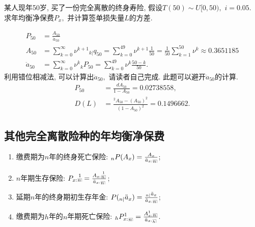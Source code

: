 \documentclass[lang=cn,10pt]{elegantbook}
\makeatletter
\DeclareRobustCommand{\annu}[1]{_{%
    \def\arraystretch{0}%
    \setlength\arraycolsep{1pt}%
    \setlength\arrayrulewidth{.2pt}%
    \begin{array}[b]{@{}c|}\hline
        \\[\arraycolsep]%
        \scriptstyle #1%
    \end{array}%
}}
\makeatother
\begin{document}
\begin{example}
    某人现年50岁, 买了一份完全离散的终身寿险, 假设$T(50)\sim U[0,50),$ $i=0.05.$ 求年均衡净保费$P_{x},$ 并计算签单损失量$L$的方差.
\end{example}
\begin{solution}
    \begin{align*}
        P_{50}        & =\frac{A_{50}}{\ddot{a}_{50}}                                                                                      \\
        A_{50}        & =\sum^{\infty}_{k=0}\nu^{k+1}{}_{k|}q_{50}=\sum^{49}_{k=0}\nu^{k+1}\frac{1}{50}=\frac{1}{50}\sum^{50}_{k=1}\nu^{k}
        \approx 0.3651185                                                                                                                  \\
        \ddot{a}_{50} & =\sum^{\infty}_{k=0}\nu^{k}{}_{k}P_{50}=\sum^{49}_{k=0}\nu^{k}\frac{50-k}{50}.
    \end{align*}
    利用错位相减法, 可以计算出$\ddot{a}_{50},$  请读者自己完成. 此题可以避开$\ddot{a}_{50}$的计算.
    \begin{align*}
        P_{50} & =\frac{dA_{50}}{1-A_{50}}=0.02738558,                     \\
        D(L)   & =\frac{^{2}A_{50}-(A_{50})^{2}}{(1-A_{50})^2}= 0.1496662.
    \end{align*}
\end{solution}

\subsection{其他完全离散险种的年均衡净保费}
\begin{proposition}
    \begin{enumerate}
        \item 缴费期为$n$年的终身死亡保险: ${}_{n}P(A_{x})=\frac{A_{x}}{\ddot{a}_{x:}{}\annu n}$;
        \item $n$年期生存保险: $P_{x:}\overset{1}{{}\annu n}=\frac{A_{x:}\overset{1}{{}\annu n}}{\ddot a_{x:}{}\annu n}$;
        \item 延期$n$年的终身期初生存年金: $P({}_{n|}\ddot a_{x})=\frac{{}_{n|}\ddot a_{x}}{\ddot{a}_{x:}{}\annu n}$;
        \item 缴费期为$h$年的$n$年期死亡保险: ${}_{h}P^{1}_{x:}{}_{\annu n}=\frac{A^{1}_{x:}{}\annu n}{\ddot a_{x:}{}{\scriptsize \annu h}}$.
    \end{enumerate}
\end{proposition}
\end{document}
